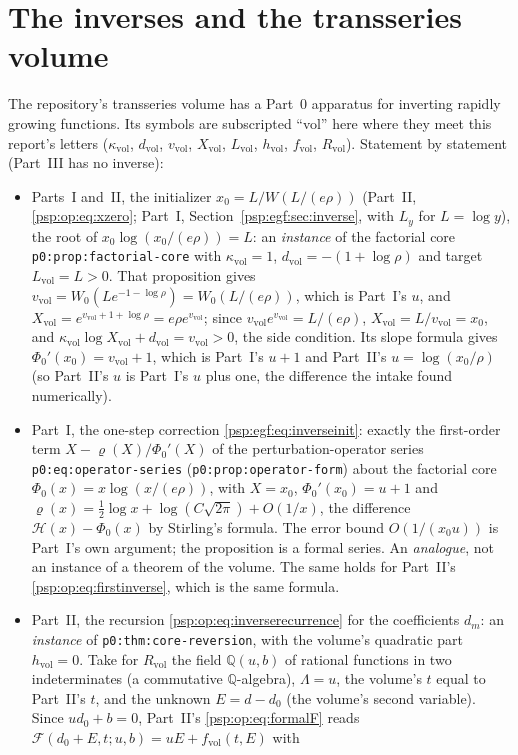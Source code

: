 \documentclass[11pt,letterpaper]{article}
\numberwithin{equation}{section}
\theoremstyle{remark}\newtheorem{remark}[theorem]{Remark}
\newcommand{\QQ}{\mathbb Q}
\newcommand{\file}[1]{\nolinkurl{#1}}
\newcommand{\vol}{\mathrm{vol}}
\begin{document}
\section*{The inverses and the transseries volume}\label{psp:sec:inverses}
The repository's transseries volume \cite{TSvol} has a Part~0 apparatus for inverting rapidly growing functions. Its symbols are subscripted ``vol'' here where they meet this report's letters ($\kappa_\vol$, $d_\vol$, $v_\vol$, $X_\vol$, $L_\vol$, $h_\vol$, $f_\vol$, $R_\vol$). Statement by statement (Part~III has no inverse):
\begin{itemize}
\item Parts~I and~II, the initializer $x_0=L/W(L/(e\rho))$ (Part~II, \eqref{psp:op:eq:xzero}; Part~I, Section~\ref{psp:egf:sec:inverse}, with $L_y$ for $L=\log y$), the root of $x_0\log(x_0/(e\rho))=L$: an \emph{instance} of the factorial core \file{p0:prop:factorial-core} with $\kappa_\vol=1$, $d_\vol=-(1+\log\rho)$ and target $L_\vol=L>0$. That proposition gives $v_\vol=W_0(Le^{-1-\log\rho})=W_0(L/(e\rho))$, which is Part~I's $u$, and $X_\vol=e^{v_\vol+1+\log\rho}=e\rho e^{v_\vol}$; since $v_\vol e^{v_\vol}=L/(e\rho)$, $X_\vol=L/v_\vol=x_0$, and $\kappa_\vol\log X_\vol+d_\vol=v_\vol>0$, the side condition. Its slope formula gives $\Phi_0'(x_0)=v_\vol+1$, which is Part~I's $u+1$ and Part~II's $u=\log(x_0/\rho)$ (so Part~II's $u$ is Part~I's $u$ plus one, the difference the intake found numerically).
\item Part~I, the one-step correction \eqref{psp:egf:eq:inverseinit}: exactly the first-order term $X-\varrho(X)/\Phi_0'(X)$ of the perturbation-operator series \file{p0:eq:operator-series} (\file{p0:prop:operator-form}) about the factorial core $\Phi_0(x)=x\log(x/(e\rho))$, with $X=x_0$, $\Phi_0'(x_0)=u+1$ and $\varrho(x)=\frac12\log x+\log(C\sqrt{2\pi})+O(1/x)$, the difference $\mathcal H(x)-\Phi_0(x)$ by Stirling's formula. The error bound $O(1/(x_0u))$ is Part~I's own argument; the proposition is a formal series. An \emph{analogue}, not an instance of a theorem of the volume. The same holds for Part~II's \eqref{psp:op:eq:firstinverse}, which is the same formula.
\item Part~II, the recursion \eqref{psp:op:eq:inverserecurrence} for the coefficients $d_m$: an \emph{instance} of \file{p0:thm:core-reversion}, with the volume's quadratic part $h_\vol=0$. Take for $R_\vol$ the field $\QQ(u,b)$ of rational functions in two indeterminates (a commutative $\QQ$-algebra), $\Lambda=u$, the volume's $t$ equal to Part~II's $t$, and the unknown $E=d-d_0$ (the volume's second variable). Since $ud_0+b=0$, Part~II's \eqref{psp:op:eq:formalF} reads $\mathcal F(d_0+E,t;u,b)=uE+f_\vol(t,E)$ with

\end{itemize}
\end{document}
